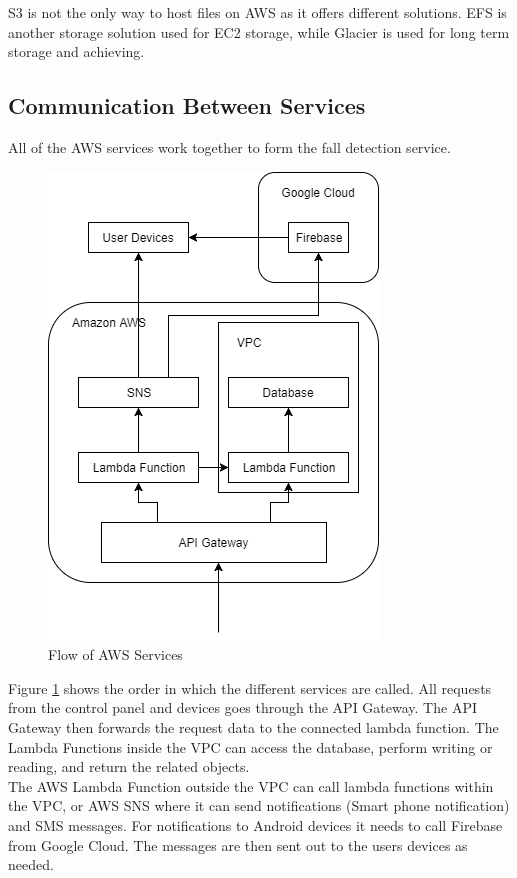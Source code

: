 S3 is not the only way to host files on AWS as it offers different solutions. EFS is another storage solution used for EC2 storage, while Glacier is used for long term storage and achieving.

\subsection{Communication Between Services}\label{sec:communication-services}
All of the AWS services work together to form the fall detection service.

\begin{figure}[H]
    \centering
    \includegraphics[scale=0.7]{Figures/aws_diagram.png}
    \caption{Flow of AWS Services}
    \label{fig:aws_diagram}
\end{figure}

Figure \ref{fig:aws_diagram} shows the order in which the different services are called. All requests from the control panel and devices goes through the API Gateway. The API Gateway then forwards the request data to the connected lambda function. The Lambda Functions inside the VPC can access the database, perform writing or reading, and return the related objects.\\
The AWS Lambda Function outside the VPC can call lambda functions within the VPC, or AWS SNS where it can send notifications (Smart phone notification) and SMS messages. For notifications to Android devices it needs to call Firebase from Google Cloud. The messages are then sent out to the users devices as needed.

